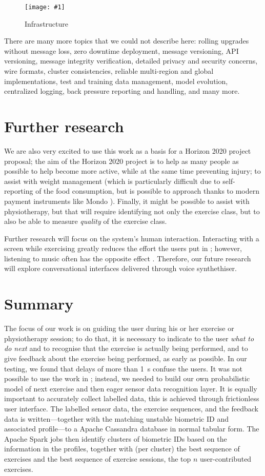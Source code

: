 \documentclass[a4paper, 10 pt, conference]{IEEEtran}
\newcommand{\fig}[3]{
  \begin{figure}[h]
    \begin{center}
        \caption{#3}
        \texttt{[image: \#1]}
        \label{fig:#2}
    \end{center}
  \end{figure}
}
\begin{document}
\fig{ri-infrastructure.png}{ri-infrastructure}{Infrastructure}

There are many more topics that we could not describe here: rolling upgrades without message loss, zero downtime deployment, message versioning, API versioning, message integrity verification, detailed privacy and security concerns, wire formats, cluster consistencies, reliable multi-region and global implementations, test and training data management, model evolution, centralized logging, back pressure reporting and handling, and many more. 

\section{Further research}

We are also very excited to use this work as a basis for a Horizon 2020 \cite{horizon2020} project proposal; the aim of the Horizon 2020 project is to help as many people as possible to help become more active, while at the same time preventing injury; to assist with weight management (which is particularly difficult due to self-reporting of the food consumption, but is possible to approach thanks to modern payment instruments like Mondo \cite{mondo}). Finally, it might be possible to assist with physiotherapy, but that will require identifying not only the exercise class, but to also be able to measure \emph{quality} of the exercise class.

Further research will focus on the system's human interaction. Interacting with a screen while exercising greatly reduces the effort the users put in \cite{!!!}; however, listening to music often has the opposite effect \cite{!!!}. Therefore, our future research will explore conversational interfaces delivered through voice synthethiser. 

\section{Summary}

The focus of our work is on guiding the user during his or her exercise or physiotherapy session; to do that, it is necessary to indicate to the user \emph{what to do next} and to recognise that the exercise is actually being performed, and to give feedback about the exercise being performed, as early as possible. In our testing, we found that delays of more than \SI{1}{\second} confuse the users. It was not possible to use the work in \cite{morris:2014ir}; instead, we needed to build our own probabilistic model of next exercise and then eager sensor data recognition layer. It is equally important to accurately collect labelled data, this is achieved through frictionless user interface. The labelled sensor data, the exercise sequences, and the feedback data is written---together with the matching unstable biometric ID and associated profile---to a Apache Cassandra database in normal tabular form. The Apache Spark jobs then identify clusters of biometric IDs based on the information in the profiles, together with (per cluster) the best sequence of exercises and the best sequence of exercise sessions, the top $n$ user-contributed exercises.
\end{document}
